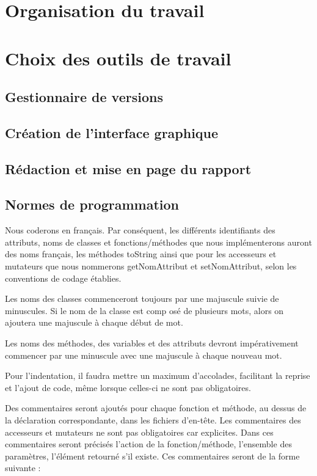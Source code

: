 \documentclass{report}
\begin{document}
\section{Organisation du travail}

\section{Choix des outils de travail}
\subsection{Gestionnaire de versions}
\subsection{Création de l'interface graphique}
\subsection{Rédaction et mise en page du rapport}
\subsection{Normes de programmation}
Nous coderons en français. Par conséquent, les différents identifiants des attributs, noms de classes et fonctions/méthodes que nous implémenterons auront des noms français, les méthodes toString ainsi que pour les accesseurs et mutateurs que nous nommerons getNomAttribut et setNomAttribut,
selon les conventions de codage établies.\par

Les noms des classes commenceront toujours par une majuscule suivie de minuscules. Si le nom de la classe est comp osé de plusieurs mots, alors on ajoutera une majuscule à chaque début de mot.\par

Les noms des méthodes, des variables et des attributs devront impérativement commencer par une minuscule avec une majuscule à chaque nouveau mot.\par

Pour l'indentation, il faudra mettre un maximum d'accolades, facilitant la reprise et l'ajout de code, même lorsque celles-ci ne sont pas obligatoires.\par

Des commentaires seront ajoutés pour chaque fonction et méthode, au dessus de la déclaration correspondante, dans les fichiers d'en-tête. Les commentaires des accesseurs et mutateurs ne sont pas obligatoires car explicites.
Dans ces commentaires seront précisés l'action de la fonction/méthode, l'ensemble des paramètres, l'élément retourné s'il existe. Ces commentaires seront de la forme suivante : \par
\end{document}
